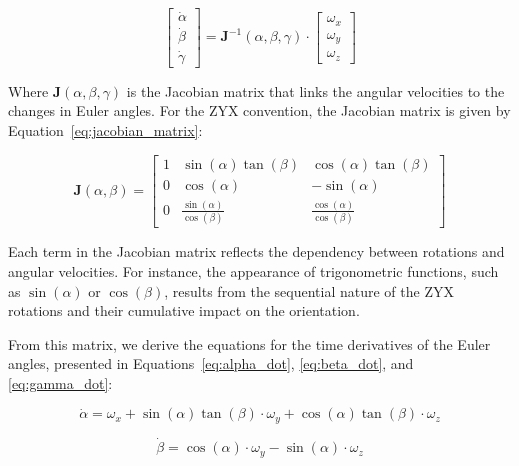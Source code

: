 \documentclass[12pt]{article}
\begin{document}
\begin{equation}
\label{eq:jacobian_relationship}
\begin{bmatrix}
\dot{\alpha} \\
\dot{\beta} \\
\dot{\gamma}
\end{bmatrix} = 
\mathbf{J}^{-1}(\alpha, \beta, \gamma) \cdot 
\begin{bmatrix}
\omega_x \\
\omega_y \\
\omega_z
\end{bmatrix}
\end{equation}

Where \( \mathbf{J}(\alpha, \beta, \gamma) \) is the Jacobian matrix that links the angular velocities to the changes in Euler angles. For the ZYX convention, the Jacobian matrix is given by Equation~\eqref{eq:jacobian_matrix}:

\begin{equation}
\label{eq:jacobian_matrix}
\mathbf{J}(\alpha, \beta) =
\begin{bmatrix}
1 & \sin(\alpha) \tan(\beta) & \cos(\alpha) \tan(\beta) \\
0 & \cos(\alpha) & -\sin(\alpha) \\
0 & \frac{\sin(\alpha)}{\cos(\beta)} & \frac{\cos(\alpha)}{\cos(\beta)}
\end{bmatrix}
\end{equation}

Each term in the Jacobian matrix reflects the dependency between rotations and angular velocities. For instance, the appearance of trigonometric functions, such as \(\sin(\alpha)\) or \(\cos(\beta)\), results from the sequential nature of the ZYX rotations and their cumulative impact on the orientation.

From this matrix, we derive the equations for the time derivatives of the Euler angles, presented in Equations~\eqref{eq:alpha_dot}, \eqref{eq:beta_dot}, and \eqref{eq:gamma_dot}:

\begin{equation}
\label{eq:alpha_dot}
\dot{\alpha} = \omega_x + \sin(\alpha) \tan(\beta) \cdot \omega_y + \cos(\alpha) \tan(\beta) \cdot \omega_z
\end{equation}

\begin{equation}
\label{eq:beta_dot}
\dot{\beta} = \cos(\alpha) \cdot \omega_y - \sin(\alpha) \cdot \omega_z
\end{equation}
\end{document}

